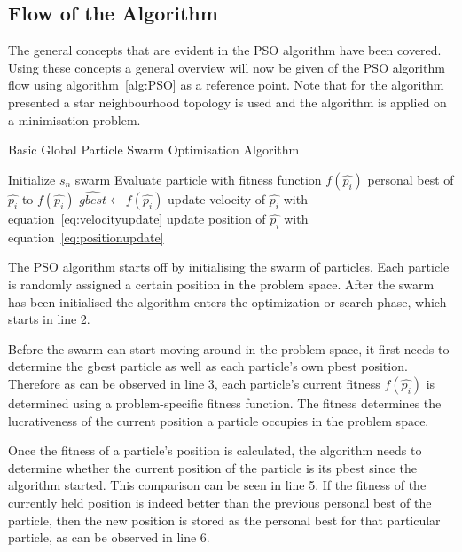 \subsection{Flow of the Algorithm}
The general concepts that are evident in the \gls{PSO} algorithm have been covered. Using these concepts a general overview will now be given of the \gls{PSO} algorithm flow using algorithm~\ref{alg:PSO} as a reference point. Note that for the algorithm presented a star neighbourhood topology is used and the algorithm is applied on a minimisation problem.
\begin{algorithm}[H]
\caption{Basic Global Particle Swarm Optimisation Algorithm\cite{CompuIntelligenceIntro}}
\label{alg:PSO}
	\begin{algorithmic}[1]
		\State Initialize $s_n$ swarm
				\State Evaluate particle with fitness function $f(\hat{p_i})$
					\State personal best of $\hat{p_i}$ to $f(\hat{p_i})$
				\EndIf
					\State $\hat{gbest} \leftarrow f(\hat{p_i})$
				\EndIf
			\EndFor
				\State update velocity of $\hat{p_i}$ with equation~\ref{eq:velocityupdate}
				\State update position of $\hat{p_i}$ with equation~\ref{eq:positionupdate}
			\EndFor
		\EndWhile
	\end{algorithmic}
\end{algorithm}

The \gls{PSO} algorithm starts off by initialising the swarm of particles. Each particle is randomly assigned a certain position in the problem space. After the swarm has been initialised the algorithm enters the optimization or search phase, which starts in line 2.

Before the swarm can start moving around in the problem space, it first needs to determine the gbest particle as well as each particle's own pbest position. Therefore as can be observed in line 3, each particle's current fitness $f(\hat{p_i})$ is determined using a problem-specific fitness function. The fitness determines the lucrativeness of the current position a particle occupies in the problem space.

Once the fitness of a particle's position is calculated, the algorithm needs to determine whether the current position of the particle is its pbest since the algorithm started. This comparison can be seen in line 5.
If the fitness of the currently held position is indeed better than the previous personal best of the particle, then the new position is stored as the personal best for that particular particle, as can be observed in line 6.

